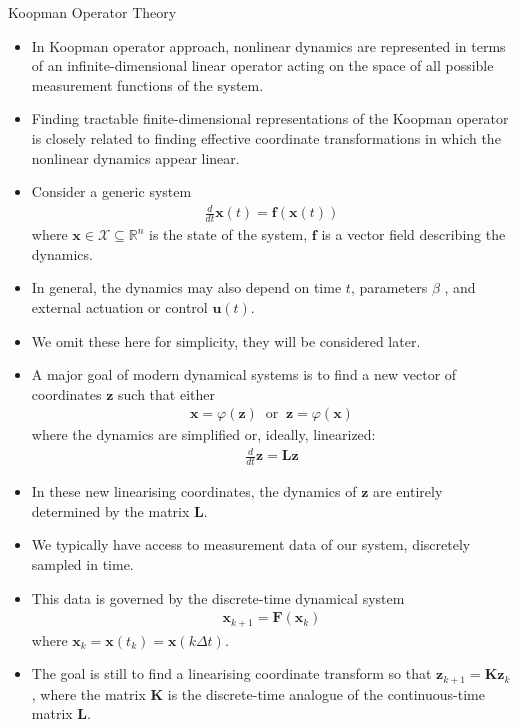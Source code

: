 \documentclass[hyperref={pdfpagemode=FullScreen},aspectratio=169]{beamer}
\begin{document}
\begin{frame}{Koopman Operator Theory}
\begin{itemize}
\setlength\itemsep{1em}
\item In Koopman operator approach,  nonlinear dynamics are represented in terms of an infinite-dimensional linear operator acting on the space of all possible measurement functions of the system.
\item Finding tractable finite-dimensional representations of the Koopman operator is closely related to finding effective coordinate transformations in which the nonlinear dynamics appear linear.
\item Consider a generic system
\begin{align}
\frac{d}{dt}\mathbf{x}(t) = \mathbf{f}(\mathbf{x}(t))
\end{align}
where $\mathbf{x} \in \mathcal{X} \subseteq \mathbb{R}^n$ is the state of the system, $\mathbf{f}$ is a vector field describing the dynamics.
\item In general, the dynamics may also depend on time $t$, parameters $\beta$ , and external
actuation or control $\mathbf{u}(t)$.
\item We omit these here for simplicity, they will be considered later.
\end{itemize}
\end{frame}
\begin{frame}{}
\begin{itemize}
\setlength\itemsep{1em}
\item A major goal of modern dynamical systems is to find a new vector of coordinates $\mathbf{z}$ such that either
\begin{align}
\mathbf{x} = \varphi(\mathbf{z}) \;\; \text{or} \;\; \mathbf{z}=\varphi(\mathbf{x})
\end{align}
where the dynamics are simplified or, ideally, linearized:
\begin{align}
\frac{d}{dt}\mathbf{z} = \mathbf{L}\mathbf{z}
\end{align}
\item In these new linearising coordinates, the dynamics of $\mathbf{z}$ are entirely determined by the matrix $\mathbf{L}$.
\item We typically have access to measurement data of our system, discretely sampled in time. 
\item This data is governed by the discrete-time dynamical system
\begin{align}
\mathbf{x}_{k+1} = \mathbf{F}(\mathbf{x}_k)
\end{align}
where $\mathbf{x}_k = \mathbf{x}(t_k) = \mathbf{x}(k\Delta t)$.
\item The goal is still to find a linearising coordinate transform so that $\mathbf{z}_{k+1} = \mathbf{K}\mathbf{z}_k$, where the matrix $\mathbf{K}$ is the discrete-time analogue of the continuous-time matrix $\mathbf{L}$.
\end{itemize}
\end{frame}
\end{document}
